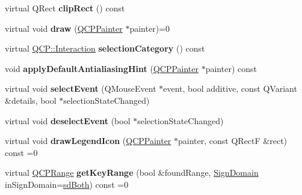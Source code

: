 \begin{DoxyCompactItemize}
\item 
\hypertarget{classQCPAbstractPlottable_ac01960b0827913922f5364d559c124ed}{}virtual Q\+Rect {\bfseries clip\+Rect} () const \label{classQCPAbstractPlottable_ac01960b0827913922f5364d559c124ed}

\item 
\hypertarget{classQCPAbstractPlottable_acbab5e30dcd04fd302b4a5902ac2c482}{}virtual void {\bfseries draw} (\hyperlink{classQCPPainter}{Q\+C\+P\+Painter} $\ast$painter)=0\label{classQCPAbstractPlottable_acbab5e30dcd04fd302b4a5902ac2c482}

\item 
\hypertarget{classQCPAbstractPlottable_a5eef607bcc2aee8bfe2380a8710f6c64}{}virtual \hyperlink{namespaceQCP_a2ad6bb6281c7c2d593d4277b44c2b037}{Q\+C\+P\+::\+Interaction} {\bfseries selection\+Category} () const \label{classQCPAbstractPlottable_a5eef607bcc2aee8bfe2380a8710f6c64}

\item 
\hypertarget{classQCPAbstractPlottable_a76e9d6cc7972dc1528f526d163766aca}{}void {\bfseries apply\+Default\+Antialiasing\+Hint} (\hyperlink{classQCPPainter}{Q\+C\+P\+Painter} $\ast$painter) const \label{classQCPAbstractPlottable_a76e9d6cc7972dc1528f526d163766aca}

\item 
\hypertarget{classQCPAbstractPlottable_a16aaad02456aa23a759efd1ac90c79bf}{}virtual void {\bfseries select\+Event} (Q\+Mouse\+Event $\ast$event, bool additive, const Q\+Variant \&details, bool $\ast$selection\+State\+Changed)\label{classQCPAbstractPlottable_a16aaad02456aa23a759efd1ac90c79bf}

\item 
\hypertarget{classQCPAbstractPlottable_a6fa0d0f95560ea8b01ee13f296dab2b1}{}virtual void {\bfseries deselect\+Event} (bool $\ast$selection\+State\+Changed)\label{classQCPAbstractPlottable_a6fa0d0f95560ea8b01ee13f296dab2b1}

\item 
\hypertarget{classQCPAbstractPlottable_a9a450783fd9ed539e589999fd390cdf7}{}virtual void {\bfseries draw\+Legend\+Icon} (\hyperlink{classQCPPainter}{Q\+C\+P\+Painter} $\ast$painter, const Q\+Rect\+F \&rect) const =0\label{classQCPAbstractPlottable_a9a450783fd9ed539e589999fd390cdf7}

\item 
\hypertarget{classQCPAbstractPlottable_a345d702b2e7e12c8cfdddff65ba85e8c}{}virtual \hyperlink{classQCPRange}{Q\+C\+P\+Range} {\bfseries get\+Key\+Range} (bool \&found\+Range, \hyperlink{classQCPAbstractPlottable_a661743478a1d3c09d28ec2711d7653d8}{Sign\+Domain} in\+Sign\+Domain=\hyperlink{classQCPAbstractPlottable_a661743478a1d3c09d28ec2711d7653d8a082b98cfb91a7363a3b5cd17b0c1cd60}{sd\+Both}) const =0\label{classQCPAbstractPlottable_a345d702b2e7e12c8cfdddff65ba85e8c}


\end{DoxyCompactItemize}
